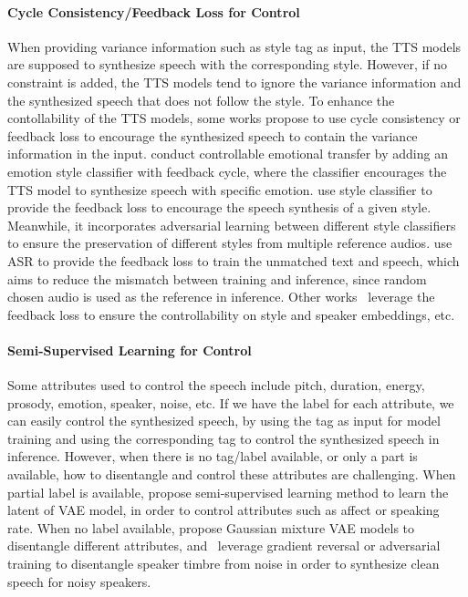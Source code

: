 \documentclass{article}
\begin{document}
\paragraph{Cycle Consistency/Feedback Loss for Control} When providing variance information such as style tag as input, the TTS models are supposed to synthesize speech with the corresponding style. However, if no constraint is added, the TTS models tend to ignore the variance information and the synthesized speech that does not follow the style. To enhance the contollability of the TTS models, some works propose to use cycle consistency or feedback loss to encourage the synthesized speech to contain the variance information in the input. \citet{li2021controllable} conduct controllable emotional transfer by adding an emotion style classifier with feedback cycle, where the classifier encourages the TTS model to synthesize speech with specific emotion. \citet{whitehill2020multi} use style classifier to provide the feedback loss to encourage the speech synthesis of a given style. Meanwhile, it incorporates adversarial learning between different style classifiers to ensure the preservation of different styles from multiple reference audios. \citet{liu2018improving} use ASR to provide the feedback loss to train the unmatched text and speech, which aims to reduce the mismatch between training and inference, since random chosen audio is used as the reference in inference. Other works~\cite{nachmani2018fitting,liu2020expressive,cai2020speaker,shi2020aishell,xue2021cycle,an2021improving} leverage the feedback loss to ensure the controllability on style and speaker embeddings, etc. 


\paragraph{Semi-Supervised Learning for Control}
Some attributes used to control the speech include pitch, duration, energy, prosody, emotion, speaker, noise, etc. If we have the label for each attribute, we can easily control the synthesized speech, by using the tag as input for model training and using the corresponding tag to control the synthesized speech in inference. However, when there is no tag/label available, or only a part is available, how to disentangle and control these attributes are challenging. When partial label is available, \citet{habib2019semi} propose semi-supervised learning method to learn the latent of VAE model, in order to control attributes such as affect or speaking rate. When no label available, \citet{hsu2018hierarchical} propose Gaussian mixture VAE models to disentangle different attributes, and~\citet{hsu2019disentangling,zhang2020denoising} leverage gradient reversal or adversarial training to disentangle speaker timbre from noise in order to synthesize clean speech for noisy speakers.
\end{document}
